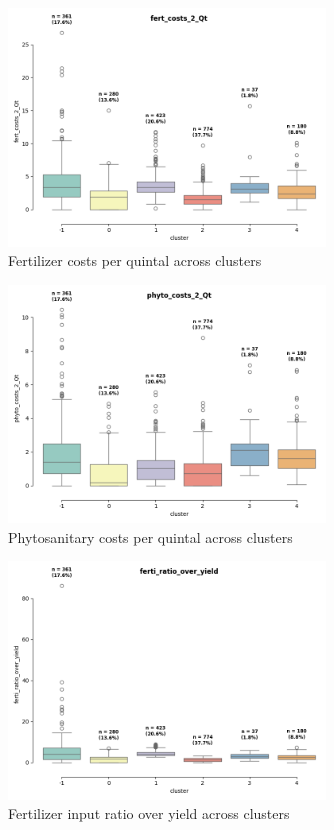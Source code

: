 \documentclass[a4paper,12pt]{article}
\begin{document}
\begin{figure}[h!]
    \centering
    \includegraphics[width=0.75\textwidth]{clustering_pipeline/output/20250404_boxplot_fert_costs_2_Qt.png}
    \caption{Fertilizer costs per quintal across clusters}
\end{figure}

\begin{figure}[h!]
    \centering
    \includegraphics[width=0.75\textwidth]{clustering_pipeline/output/20250404_boxplot_phyto_costs_2_Qt.png}
    \caption{Phytosanitary costs per quintal across clusters}
\end{figure}

\begin{figure}[h!]
    \centering
    \includegraphics[width=0.75\textwidth]{clustering_pipeline/output/20250404_boxplot_ferti_ratio_over_yield.png}
    \caption{Fertilizer input ratio over yield across clusters}
\end{figure}
\end{document}
